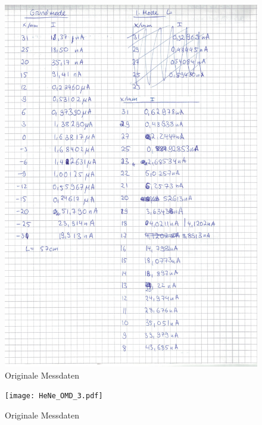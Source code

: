 \begin{figure}
  \centering
  \includegraphics[width=\textwidth]{HeNe_OMD_2.pdf}
  \caption{Originale Messdaten}
  \label{OMD}
\end{figure}

\begin{figure}
  \centering
  \texttt{[image: HeNe\_OMD\_3.pdf]}
  \caption{Originale Messdaten}
  \label{OMD}
\end{figure}



